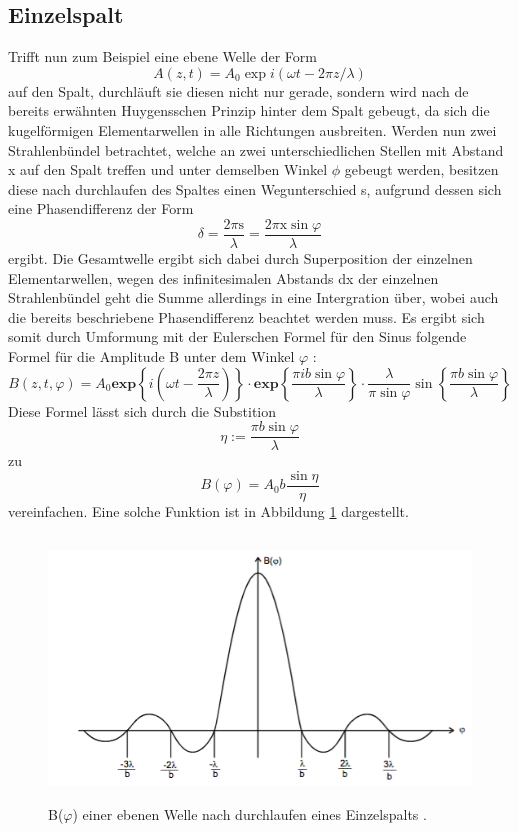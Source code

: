 \subsection{Einzelspalt}
Trifft nun zum Beispiel eine ebene Welle der Form
\begin{equation}
  A(z,t) = A_0 \exp{i(\omega t - 2\pi z / \lambda)}
  \label{eqn:welle}
\end{equation}
auf den Spalt, durchläuft sie diesen nicht nur gerade, sondern wird nach de bereits
erwähnten Huygensschen Prinzip hinter dem Spalt gebeugt, da sich die kugelförmigen
Elementarwellen in alle Richtungen ausbreiten.
Werden nun zwei Strahlenbündel betrachtet, welche an zwei unterschiedlichen Stellen
mit Abstand x auf den Spalt treffen und unter demselben Winkel $\phi$ gebeugt werden,
besitzen diese nach durchlaufen des Spaltes einen Wegunterschied s, aufgrund dessen
sich eine Phasendifferenz der Form
\begin{equation}
  \delta = \frac{2\pi \text{s}}{\lambda} = \frac{2\pi \text{x} \sin{\varphi}}{\lambda}
  \label{eqn:pdif}
\end{equation}
ergibt.
Die Gesamtwelle ergibt sich dabei durch Superposition der einzelnen Elementarwellen,
wegen des infinitesimalen Abstands dx der einzelnen Strahlenbündel geht die Summe
allerdings in eine Intergration über, wobei auch die bereits beschriebene Phasendifferenz
beachtet werden muss.
Es ergibt sich somit durch Umformung mit der Eulerschen Formel für den Sinus
folgende Formel für die Amplitude B unter dem Winkel $\varphi$ :
\begin{equation}
  B(z,t,\varphi) = A_0 \textbf{exp}\left\{i\left(\omega t - \frac{2\pi z}{\lambda}
  \right)\right\}\cdot \textbf{exp}\left\{\frac{\pi i b \sin{\varphi}}{\lambda}\right\} \cdot
  \frac{\lambda}{\pi \sin{\varphi}}\sin\left\{{\frac{\pi b \sin{\varphi}}{\lambda}}\right\}
  \label{eqn:einzel1}
\end{equation}
Diese Formel lässt sich durch die Substition
\begin{equation}
  \eta := \frac{\pi b \sin{\varphi}}{\lambda}
\end{equation}
zu
\begin{equation}
  B(\varphi) = A_0 b \frac{\sin{\eta}}{\eta}
  \label{eqn:einzel2}
\end{equation}
vereinfachen.
Eine solche Funktion ist in Abbildung \ref{fig:kurve} dargestellt.
\begin{figure}[H]
  \centering
  \includegraphics[height=7cm]{Kurve.png}
  \caption{B($\varphi$) einer ebenen Welle nach durchlaufen eines Einzelspalts \cite{skript}.}
  \label{fig:kurve}
\end{figure}
